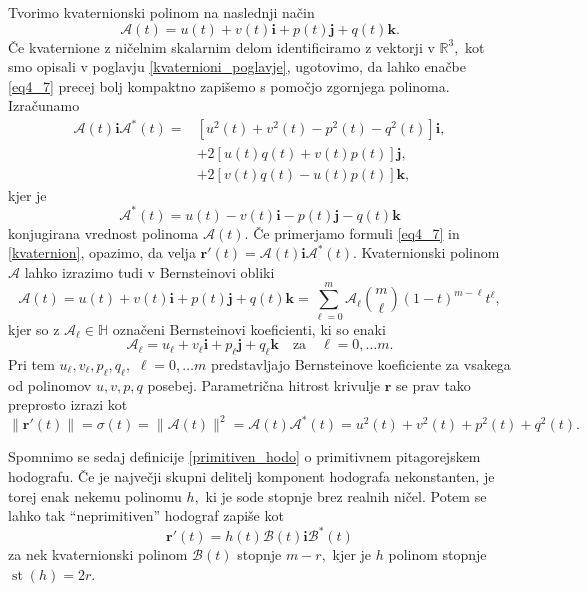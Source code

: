 \documentclass[12pt,a4paper,twoside]{article}
\theoremstyle{definition} %
\theoremstyle{plain} %
\theoremstyle{primerstyle}
\numberwithin{equation}{section}  %
\newcommand{\R}{\mathbb R}
\newcommand{\quat}{\mathbb H}
\newcommand{\rV}{\mathbf{r}}
\newcommand{\iV}{\mathbf{i}}
\newcommand{\jV}{\mathbf{j}}
\newcommand{\kV}{\mathbf{k}}
\newcommand{\AQ}{\mathcal{A}}
\newcommand{\BQ}{\mathcal{B}}
\DeclareMathOperator{\st}{st}
\begin{document}
Tvorimo kvaternionski polinom na naslednji način
\begin{equation}
	\AQ(t)=u(t)+v(t)\iV+p(t)\jV+q(t)\kV.
\end{equation}
Če kvaternione z ničelnim skalarnim delom identificiramo z vektorji v $\R^3,$ kot smo opisali v poglavju \ref{kvaternioni_poglavje}, ugotovimo, da lahko enačbe \eqref{eq4_7} precej bolj kompaktno zapišemo s pomočjo zgornjega polinoma. Izračunamo
\begin{align}
	\AQ(t)\iV\AQ^*(t)=&[u^2(t)+v^2(t)-p^2(t)-q^2(t)]\iV, \nonumber \\
	&+2[u(t)q(t)+v(t)p(t)]\jV, \label{kvaternion} \\
	&+2[v(t)q(t)-u(t)p(t)]\kV, \nonumber
\end{align}
kjer je
\begin{equation}
	\AQ^*(t)=u(t)-v(t)\iV-p(t)\jV-q(t)\kV
\end{equation}
konjugirana vrednost polinoma $\AQ(t).$ Če primerjamo formuli \eqref{eq4_7} in \eqref{kvaternion}, opazimo, da velja $\rV'(t)=\AQ(t)\iV\AQ^*(t).$ Kvaternionski polinom $\AQ$ lahko izrazimo tudi v Bernsteinovi obliki
\begin{equation}
	\AQ(t)=u(t)+v(t)\iV+p(t)\jV+q(t)\kV=\sum_{\ell=0}^m\AQ_{\ell} \binom{m}{\ell}(1-t)^{m-\ell}t^{\ell},
\end{equation}
kjer so z $\AQ_{\ell}\in\quat$ označeni Bernsteinovi koeficienti, ki so enaki
\begin{equation}
	\label{bern_koef_quat}
	\AQ_{\ell}=u_{\ell}+v_{\ell}\iV+p_{\ell}\jV+q_{\ell}\kV \quad \text{za} \quad \ell=0,\dots m.
\end{equation}
Pri tem $u_{\ell},v_{\ell},p_{\ell},q_{\ell},$ $\ell=0,\dots m$ predstavljajo Bernsteinove koeficiente za vsakega od polinomov $u,v,p,q$ posebej. Parametrična hitrost krivulje $\rV$ se prav tako preprosto izrazi kot
\begin{equation}
	\label{kvaternionska_hitrost}
	\lVert \rV'(t) \rVert=\sigma(t)=\lVert \AQ(t) \rVert^2=\AQ(t) \AQ^*(t)=u^2(t)+v^2(t)+p^2(t)+q^2(t).
\end{equation}

Spomnimo se sedaj definicije \ref{primitiven_hodo} o primitivnem pitagorejskem hodografu. Če je največji skupni delitelj komponent hodografa nekonstanten, je torej enak nekemu polinomu $h,$ ki je sode stopnje brez realnih ničel. Potem se lahko tak ``neprimitiven'' hodograf zapiše kot
\begin{equation}
	\label{Bkvaternion}
	\rV'(t)=h(t)\BQ(t)\iV\BQ^*(t)
\end{equation}
za nek kvaternionski polinom $\BQ(t)$ stopnje $m-r,$ kjer je $h$ polinom stopnje $\st(h)=2r.$
\end{document}
